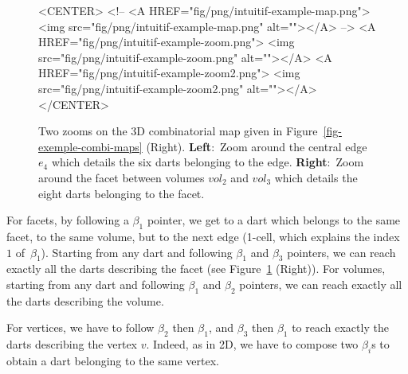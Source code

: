 \begin{figure}
\begin{ccTexOnly}
\begin{center}
    \end{center}
  \end{ccTexOnly}
  \begin{ccHtmlOnly}
    <CENTER>
    <!-- <A HREF="fig/png/intuitif-example-map.png">
    <img src="fig/png/intuitif-example-map.png" alt=""></A> -->
    <A HREF="fig/png/intuitif-example-zoom.png">
        <img src="fig/png/intuitif-example-zoom.png" alt=""></A>
    <A HREF="fig/png/intuitif-example-zoom2.png">
        <img src="fig/png/intuitif-example-zoom2.png" alt=""></A>
    </CENTER>
    \end{ccHtmlOnly}
    \caption{Two zooms on the 3D combinatorial map given in 
      Figure~\ref{fig-exemple-combi-maps} (Right).
      \textbf{Left}:~Zoom around the central edge $e_4$ which details
      the six darts belonging to the edge.  \textbf{Right}:~Zoom
      around the facet between volumes $vol_2$ and $vol_3$ which
      details the eight darts belonging to the facet.}
    \label{fig-intuitive-exemple}
\end{figure}

For facets, by following a $\beta_1$ pointer, we get to a dart which
belongs to the same facet, to the same volume, but to the next edge
(1-cell, which explains the index~$1$ of~$\beta_1$).  Starting from any
dart and following $\beta_1$ and $\beta_3$ pointers, we can reach
exactly all the darts describing the facet (see
Figure~\ref{fig-intuitive-exemple} (Right)).
%
For volumes, starting from any dart and following $\beta_1$ and
$\beta_2$ pointers, we can reach exactly all the darts describing the
volume.

For vertices, we have to follow $\beta_2$ then $\beta_1$, and
$\beta_3$ then $\beta_1$ to reach exactly the darts describing the
vertex $v$. Indeed, as in 2D, we have to compose two $\beta_i$s to
obtain a dart belonging to the same vertex.


